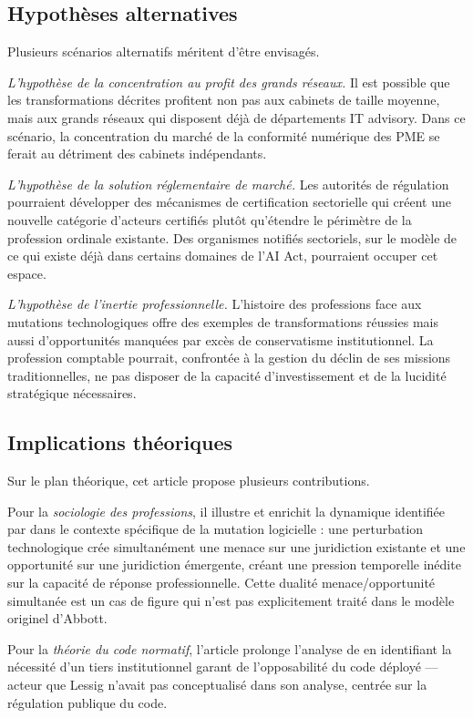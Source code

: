 \documentclass[12pt,a4paper]{article}
\begin{document}
\subsection{Hypothèses alternatives}

Plusieurs scénarios alternatifs méritent d'être envisagés.

\textit{L'hypothèse de la concentration au profit des grands réseaux.} Il est possible que les transformations décrites profitent non pas aux cabinets de taille moyenne, mais aux grands réseaux qui disposent déjà de départements IT advisory. Dans ce scénario, la concentration du marché de la conformité numérique des PME se ferait au détriment des cabinets indépendants.

\textit{L'hypothèse de la solution réglementaire de marché.} Les autorités de régulation pourraient développer des mécanismes de certification sectorielle qui créent une nouvelle catégorie d'acteurs certifiés plutôt qu'étendre le périmètre de la profession ordinale existante. Des organismes notifiés sectoriels, sur le modèle de ce qui existe déjà dans certains domaines de l'AI Act, pourraient occuper cet espace.

\textit{L'hypothèse de l'inertie professionnelle.} L'histoire des professions face aux mutations technologiques offre des exemples de transformations réussies mais aussi d'opportunités manquées par excès de conservatisme institutionnel. La profession comptable pourrait, confrontée à la gestion du déclin de ses missions traditionnelles, ne pas disposer de la capacité d'investissement et de la lucidité stratégique nécessaires.

\subsection{Implications théoriques}

Sur le plan théorique, cet article propose plusieurs contributions.

Pour la \textit{sociologie des professions}, il illustre et enrichit la dynamique identifiée par \textcite{abbott1988} dans le contexte spécifique de la mutation logicielle : une perturbation technologique crée simultanément une menace sur une juridiction existante et une opportunité sur une juridiction émergente, créant une pression temporelle inédite sur la capacité de réponse professionnelle. Cette dualité menace/opportunité simultanée est un cas de figure qui n'est pas explicitement traité dans le modèle originel d'Abbott.

Pour la \textit{théorie du code normatif}, l'article prolonge l'analyse de \textcite{lessig1999} en identifiant la nécessité d'un tiers institutionnel garant de l'opposabilité du code déployé — acteur que Lessig n'avait pas conceptualisé dans son analyse, centrée sur la régulation publique du code.
\end{document}
